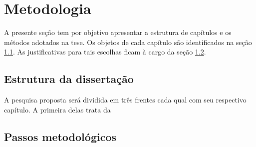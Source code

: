 {\let\clearpage\relax \chapter{Metodologia}\label{Metodo}}

A presente seção tem por objetivo apresentar a estrutura de capítulos e os métodos adotados na tese. Os objetos de cada capítulo são identificados na seção \ref{estrut}.
As justificativas para tais escolhas ficam à cargo da seção \ref{passos}. 

\section{Estrutura da dissertação}\label{estrut}
A pesquisa proposta será dividida em três frentes cada qual com seu respectivo capítulo.
A primeira delas trata da 

\section{Passos metodológicos}\label{passos}

